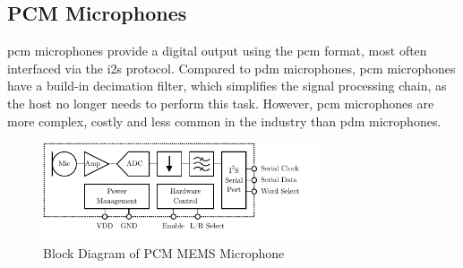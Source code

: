 \subsection{PCM Microphones} \label{sec:pcm_microphones}
\acrshort{pcm} microphones provide a digital output using the \acrlong{pcm} format, most often interfaced via the \acrshort{i2s} protocol.
Compared to \acrshort{pdm} microphones, \acrshort{pcm} microphones have a build-in decimation filter, which simplifies the signal processing chain, as the host no longer needs to perform this task.
However, \acrshort{pcm} microphones are more complex, costly and less common in the industry than \acrshort{pdm} microphones.
\begin{figure}[h!]
	\centering
	\vspace{-0.1cm}
	\includegraphics[height=2.9cm, trim={0 0.4cm 0 0}]{images/2_preliminaries/mems_microphone_types_pcm.pdf}
	\caption{Block Diagram of PCM MEMS Microphone}
	\label{fig:mems_microphone_types_pcm}
\end{figure}
\clearpage

